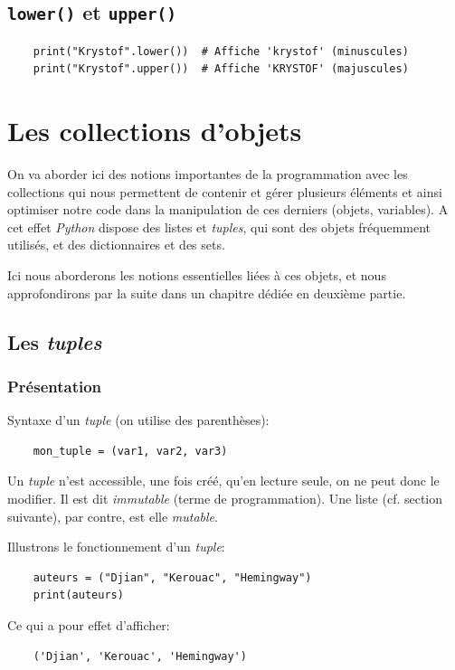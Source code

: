 \documentclass[a4paper,12pt]{book}
\begin{document}
\section{\texttt{lower()} et \texttt{upper()}}
\begin{verbatim}
    print("Krystof".lower())  # Affiche 'krystof' (minuscules)
    print("Krystof".upper())  # Affiche 'KRYSTOF' (majuscules)
\end{verbatim}
\medskip

\chapter{Les collections d'objets}\label{collections}
On va aborder ici des notions importantes de la programmation avec les collections qui nous permettent de contenir et gérer plusieurs éléments et ainsi optimiser notre code dans la manipulation de ces derniers (objets, variables). A cet effet \textit{Python} dispose des listes et \textit{tuples}, qui sont des objets fréquemment utilisés, et des dictionnaires et des sets.
\medskip

Ici nous aborderons les notions essentielles liées à ces objets, et nous approfondirons par la suite dans un chapitre dédiée en deuxième partie.
\medskip

\section{Les \textit{tuples}}
\subsection*{Présentation}
Syntaxe d'un \textit{tuple} (on utilise des parenthèses):
\begin{verbatim}
    mon_tuple = (var1, var2, var3)
\end{verbatim}
\medskip

Un \textit{tuple} n'est accessible, une fois créé, qu'en lecture seule, on ne peut donc le modifier. Il est dit \textit{immutable} (terme de programmation). Une liste (cf. section suivante), par contre, est elle \textit{mutable}.
\medskip

Illustrons le fonctionnement d'un \textit{tuple}:
\begin{verbatim}
    auteurs = ("Djian", "Kerouac", "Hemingway")
    print(auteurs)
\end{verbatim}
\medskip

Ce qui a pour effet d'afficher:
\begin{verbatim}
    ('Djian', 'Kerouac', 'Hemingway')
\end{verbatim}
\medskip
\end{document}
